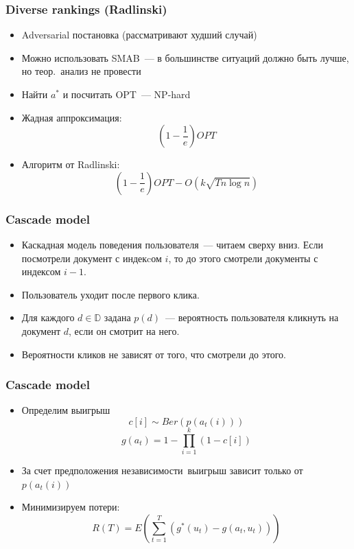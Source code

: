 \documentclass[xetex,mathserif,serif,table]{beamer}
\begin{document}
\begin{frame}
\frametitle{Diverse rankings (Radlinski)}

\begin{itemize}
\item  Adversarial  постановка (рассматривают худший случай)
\item Можно использовать SMAB — в большинстве ситуаций должно быть лучше, но теор.~анализ не провести
\item Найти $a^{*}$ и посчитать OPT — NP-hard 
\item Жадная аппроксимация: 
$$(1 - \frac{1}{e})OPT$$
\item Алгоритм от Radlinski:
$$(1 - \frac{1}{e})OPT - O(k\sqrt{Tn \log n})$$
\end{itemize}

\end{frame}


\begin{frame}
\frametitle{Cascade model}

\begin{itemize}
\item Каскадная модель поведения пользователя — читаем сверху вниз. Если посмотрели документ с индекcом $i$, то до этого смотрели документы с индексом $i-1$.
\item Пользователь уходит после первого клика.
\item Для каждого $d \in \mathbb{D}$ задана $p(d)$ — вероятность пользователя кликнуть на документ $d$, если он смотрит на него.
\item Вероятности кликов не зависят от того, что смотрели до этого.

\end{itemize}

\end{frame}

\begin{frame}
\frametitle{Cascade model}
\begin{itemize}
  \item Определим выигрыш
  $$ c[i] \sim Ber(p(a_t(i)))$$
  $$g(a_{t}) = 1 - \prod\limits_{i=1}^{k}\left(1 - c[i]\right)$$
  \item За счет предположения независимости выигрыш зависит только от $p(a_t(i))$
  \item Минимизируем потери:
  $$R(T) = E\left(\sum\limits_{t=1}^{T} \left(g^{*}(u_t) - g(a_t, u_t)\right)\right)$$
\end{itemize}
\end{frame}
 
\end{document}
